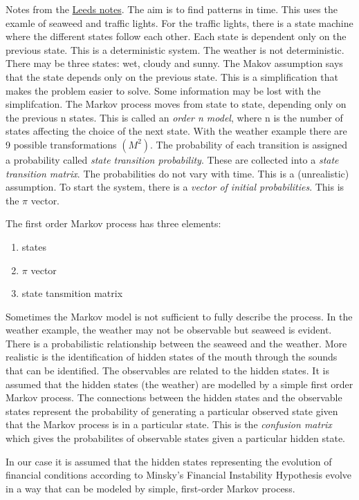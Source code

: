 \documentclass[12pt, a4paper, oneside]{article} %
\begin{document}
Notes from the \href{http://www.comp.leeds.ac.uk/roger/HiddenMarkovModels/html_dev/main.html}{Leeds notes}.  The aim is to find patterns in time. This uses the examle of seaweed and traffic lights.  For the traffic lights, there is a state machine where the different states follow each other. Each state is dependent only on the previous state. This is a deterministic system. The weather is not deterministic.  There may be three states:  wet, cloudy and sunny. The Makov assumption says that the state depends only on the previous state. This is a simplification that makes the problem easier to solve.  Some information may be lost with the simplifcation. The Markov process moves from state to state, depending only on the previous n states.  This is called an \emph{order n model}, where n is the number of states affecting the choice of the next state. With the weather example there are 9 possible transformations $(M^2)$.  The probability of each transition is assigned  a probability called \emph{state transition probability}.  These are collected into a \emph{state transition matrix}. The probabilities do not vary with time.  This is a (unrealistic) assumption. To start the system, there is a \emph{vector of initial probabilities}.  This is the $\pi$ vector.  

The first order Markov process has three elements: 
\begin{enumerate}
\item states
\item $\pi$ vector
\item state tansmition matrix
\end{enumerate}
 Sometimes the Markov model is not sufficient to fully describe the process.  In the weather example, the weather may not be observable but seaweed is evident.  There is a probabilistic relationship between the seaweed and the weather.  More realistic is the identification of hidden states of the mouth through the sounds that can be identified.  The observables are related to the hidden states. It is assumed that the hidden states (the weather) are modelled by a simple first order Markov process.  The connections between the hidden states and the observable states represent the probability of generating a particular observed state given that the Markov process is in a particular state.  This is the \emph{confusion matrix} which gives the probabilites of observable states given a particular hidden state. 
 
In our case it is assumed that the hidden states representing the evolution of financial conditions according to Minsky's Financial Instability Hypothesis evolve in a way that can be modeled by simple, first-order Markov process. 
 
\end{document}
